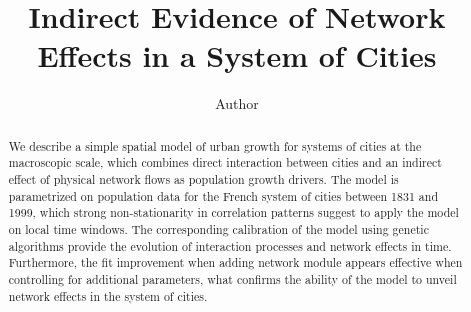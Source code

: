 \documentclass[Royal,sageh,times]{sagej}
\begin{document}

\title{Indirect Evidence of Network Effects in a System of Cities}

\author{Author}








\email{}



\begin{abstract}
We describe a simple spatial model of urban growth for systems of cities at the macroscopic scale, which combines direct interaction between cities and an indirect effect of physical network flows as population growth drivers. The model is parametrized on population data for the French system of cities between 1831 and 1999, which strong non-stationarity in correlation patterns suggest to apply the model on local time windows. The corresponding calibration of the model using genetic algorithms provide the evolution of interaction processes and network effects in time. Furthermore, the fit improvement when adding network module appears effective when controlling for additional parameters, what confirms the ability of the model to unveil network effects in the system of cities.
\end{abstract}
\end{document}
